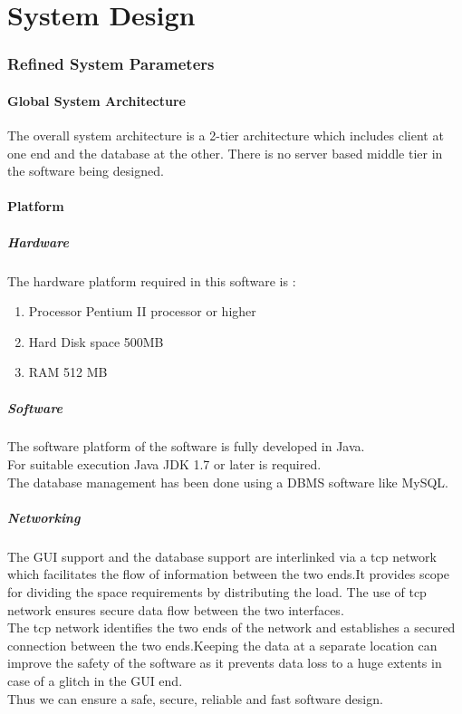 \documentclass[a4paper]{article}
\begin{document}
\part{System Design}
\section{Refined System Parameters}
\subsection{Global System Architecture}
The overall system architecture is a 2-tier architecture which includes client at one end and the
database at the other. There is no server based middle tier in the software being designed.
\subsection{Platform}
\subsubsection{Hardware}
The hardware platform required in this software is :
\begin {enumerate}
	\item Processor Pentium II processor or higher
	\item Hard Disk space 500MB
	\item RAM 512 MB
	\end{enumerate}
\subsubsection{Software}
The software platform of the software is fully developed in Java.\\
For suitable execution Java JDK 1.7 or later is required.\\
The database management has been done using a DBMS software like MySQL.\\

\subsubsection{Networking}
The GUI support and the database support are interlinked via a tcp network which facilitates the flow of information between the two ends.It provides scope for dividing the space requirements by distributing the load. The use of tcp network ensures secure data flow between the two interfaces.\\
The tcp network identifies the two ends of the network and establishes a secured connection between the two ends.Keeping the data at a separate location can improve the safety of the software as it prevents data loss to a huge extents in case of a glitch in the GUI end.
\\
Thus we can ensure a safe, secure, reliable and fast software design.\\
\end{document}
